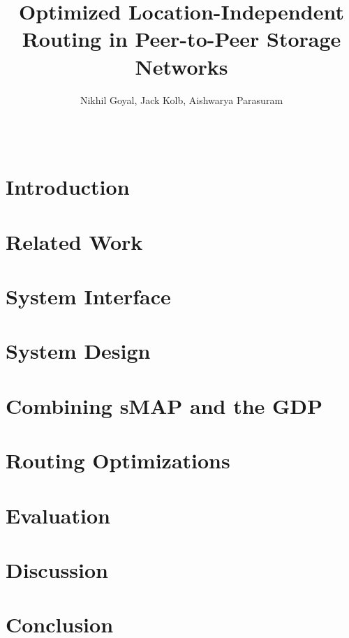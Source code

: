 \documentclass{acm_proc_article-sp}
\begin{document}
\fontsize{10pt}{12pt}\selectfont

\title{Optimized Location-Independent Routing in Peer-to-Peer Storage Networks}
\author{
\alignauthor Nikhil Goyal, Jack Kolb, Aishwarya Parasuram\\
\\
\\
}
\maketitle
\begin{abstract}

\end{abstract}

\section{Introduction}


\section{Related Work}


\section{System Interface}


\section{System Design}


\section{Combining sMAP and the GDP}


\section{Routing Optimizations}


\section{Evaluation}


\section{Discussion}


\section{Conclusion}



\nocite{*}

\end{document}
